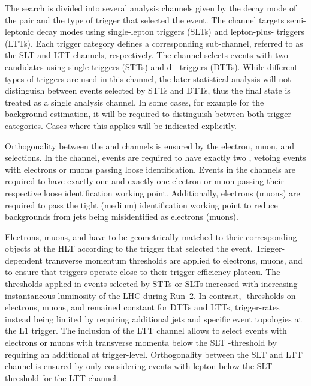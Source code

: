 The search is divided into several analysis channels given by the
decay mode of the \taulepton pair and the type of trigger that
selected the event. The \lephad channel targets semi-leptonic decay
modes using single-lepton triggers (SLTs) and lepton-plus-\tauhadvis
triggers (LTTs). Each trigger category defines a corresponding
sub-channel, referred to as the \lephad SLT and \lephad LTT channels,
respectively. The \hadhad channel selects events with two \tauhadvis
candidates using single-\tauhadvis triggers (STTs) and di-\tauhadvis
triggers (DTTs). While different types of triggers are used in this
channel, the later statistical analysis will not distinguish between
events selected by STTs and DTTs, thus the \hadhad final state is
treated as a single analysis channel. In some cases, for example for
the background estimation, it will be required to distinguish between
both trigger categories. Cases where this applies will be indicated
explicitly.

Orthogonality between the \lephad and \hadhad channels is ensured by
the electron, muon, and \tauhadvis selections. In the \hadhad channel,
events are required to have exactly two \tauhadvis, vetoing events
with electrons or muons passing loose identification. Events in the
\lephad channels are required to have exactly one \tauhadvis and
exactly one electron or muon passing their respective loose
identification working point. Additionally, electrons (muons) are
required to pass the tight (medium) identification working point to
reduce backgrounds from jets being misidentified as electrons (muons).

Electrons, muons, and \tauhadvis have to be geometrically matched to
their corresponding objects at the HLT according to the trigger that
selected the event. Trigger-dependent transverse momentum thresholds
are applied to electrons, muons, and \tauhadvis to ensure that
triggers operate close to their trigger-efficiency plateau. The
thresholds applied in events selected by STTs or SLTs increased with
increasing instantaneous luminosity of the LHC during Run~2. In
contrast, \pT-thresholds on electrons, muons, and \tauhadvis remained
constant for DTTs and LTTs, trigger-rates instead being limited by
requiring additional jets and specific event topologies at the L1
trigger. The inclusion of the \lephad LTT channel allows to select
events with electrons or muons with transverse momenta below the SLT
\pT-threshold by requiring an additional \tauhadvis at
trigger-level. Orthogonality between the \lephad SLT and LTT channel
is ensured by only considering events with lepton \pT below the SLT
\pT-threshold for the LTT channel.

